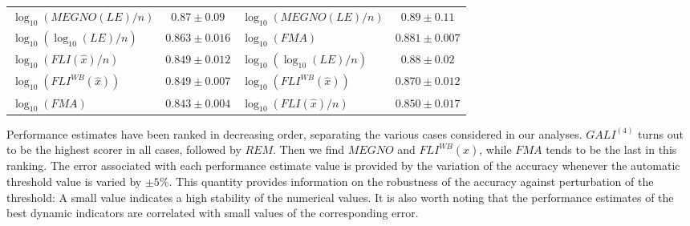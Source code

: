 \begin{table}[htb]
\begin{adjustbox}{width=\textwidth,center}
\begin{tabular}{lc|lc}
        $\log_{{10}}(MEGNO(LE)/n)$ & $0.87 \pm 0.09$ & $\log_{{10}}(MEGNO(LE)/n)$ & $0.89 \pm 0.11$ \\ 
        $\log_{{10}}(\log_{{10}}(LE)/n)$ & $0.863 \pm 0.016$ & $\log_{{10}}(FMA)$ & $0.881 \pm 0.007$ \\ 
        $\log_{{10}}(FLI(\hat{{x}})/n)$ & $0.849 \pm 0.012$ & $\log_{{10}}(\log_{{10}}(LE)/n)$ & $0.88 \pm 0.02$ \\ 
        $\log_{{10}}(FLI^{{WB}}(\hat{{x}}))$ & $0.849 \pm 0.007$ & $\log_{{10}}(FLI^{{WB}}(\hat{{x}}))$ & $0.870 \pm 0.012$ \\ 
        $\log_{{10}}(FMA)$ & $0.843 \pm 0.004$ & $\log_{{10}}(FLI(\hat{{x}})/n)$ & $0.850 \pm 0.017$ \\ 
        \hline
    \end{tabular}
    \end{adjustbox}
    \label{table:values}
\end{table}

Performance estimates have been ranked in decreasing order, separating the various cases considered in our analyses. $GALI^{(4)}$ turns out to be the highest scorer in all cases, followed by $REM$. Then we find $MEGNO$ and $FLI^{{WB}}(\hat{{x}})$, while $FMA$ tends to be the last in this ranking. The error associated with each performance estimate value is provided by the variation of the accuracy whenever the automatic threshold value is varied by $\pm 5\%$. This quantity provides information on the robustness of the accuracy against perturbation of the threshold: A small value indicates a high stability of the numerical values. It is also worth noting that the performance estimates of the best dynamic indicators are correlated with small values of the corresponding error.

